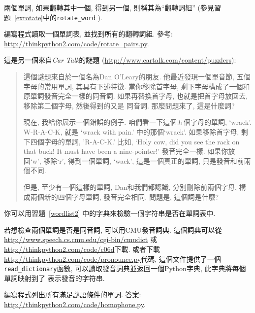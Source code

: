 \documentclass[10pt]{book}
\begin{document}
\begin{exercise}
\label{exrotatepairs}

兩個單詞, 如果翻轉其中一個, 得到另一個, 則稱其為``翻轉詞組''
(參見習題~\ref{exrotate}中的\verb"rotate_word" ).

編寫程式讀取一個單詞表, 並找到所有的翻轉詞組. 
參考: \url{http://thinkpython2.com/code/rotate_pairs.py}.

\end{exercise}


\begin{exercise}

這是另一個來自{\em Car Talk}的謎題
(\url{http://www.cartalk.com/content/puzzlers}):

\begin{quote}
這個謎題來自於一個名為Dan O'Leary的朋友. 
他最近發現一個單音節, 五個字母的常用單詞, 其具有下述特徵. 
當你移除首字母, 剩下字母構成了一個和原單詞發音完全一樣的同音詞. 
如果再替換首字母, 也就是把首字母放回去, 移除第二個字母, 然後得到的又是
同音詞. 那麼問題來了, 這是什麼詞?

現在, 我給你展示一個錯誤的例子. 
咱們看一下這個五個字母的單詞, `wrack'.  W-R-A-C-K, 就是
`wrack with pain.' 中的那個`wrack'. 
如果移除首字母, 剩下四個字母的單詞, 'R-A-C-K.' 
比如, `Holy cow, did you see the rack on that buck!
It must have been a nine-pointer!' 發音完全一樣. 
如果你放回`w', 移除`r', 得到一個單詞, `wack', 
這是一個真正的單詞, 只是發音和前兩個不同. 

但是, 至少有一個這樣的單詞, Dan和我們都認識, 
分別刪除前兩個字母, 構成兩個新的四個字母單詞, 發音完全相同. 
問題是, 這個詞是什麼?
\end{quote}

你可以用習題~\ref{wordlist2} 中的字典來檢驗一個字符串是否在單詞表中. 

若想檢查兩個單詞是否是同音詞, 可以用CMU發音詞典. 
這個詞典可以從\url{http://www.speech.cs.cmu.edu/cgi-bin/cmudict}
或\url{http://thinkpython2.com/code/c06d}下載. 
或者下載\url{http://thinkpython2.com/code/pronounce.py}代碼, 
這個文件提供了一個 \verb"read_dictionary"函數, 
可以讀取發音詞典並返回一個Python字典, 此字典將每個單詞映射到了
表示發音的字符串. 

編寫程式列出所有滿足謎語條件的單詞. 
答案: \url{http://thinkpython2.com/code/homophone.py}.

\end{exercise}
\end{document}
